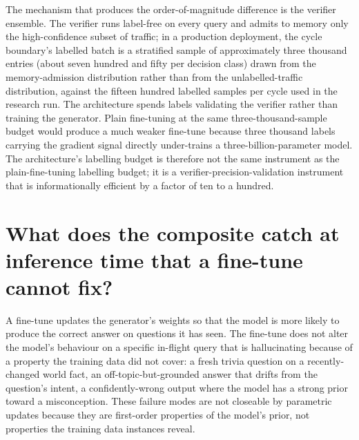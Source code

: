 The mechanism that produces the order-of-magnitude difference is the verifier ensemble. The verifier runs label-free on every query and admits to memory only the high-confidence subset of traffic; in a production deployment, the cycle boundary's labelled batch is a stratified sample of approximately three thousand entries (about seven hundred and fifty per decision class) drawn from the memory-admission distribution rather than from the unlabelled-traffic distribution, against the fifteen hundred labelled samples per cycle used in the research run. The architecture spends labels validating the verifier rather than training the generator. Plain fine-tuning at the same three-thousand-sample budget would produce a much weaker fine-tune because three thousand labels carrying the gradient signal directly under-trains a three-billion-parameter model. The architecture's labelling budget is therefore not the same instrument as the plain-fine-tuning labelling budget; it is a verifier-precision-validation instrument that is informationally efficient by a factor of ten to a hundred.


\section[What the composite catches]{What does the composite catch at inference time that a fine-tune cannot fix?}
\label{app:qa-composite-catches}

A fine-tune updates the generator's weights so that the model is more likely to produce the correct answer on questions it has seen. The fine-tune does not alter the model's behaviour on a specific in-flight query that is hallucinating because of a property the training data did not cover: a fresh trivia question on a recently-changed world fact, an off-topic-but-grounded answer that drifts from the question's intent, a confidently-wrong output where the model has a strong prior toward a misconception. These failure modes are not closeable by parametric updates because they are first-order properties of the model's prior, not properties the training data instances reveal.


